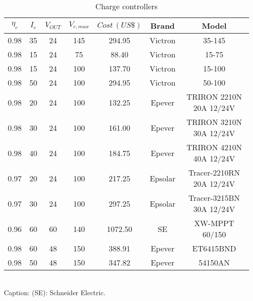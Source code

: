 \documentclass[journal,onecolumn]{IEEEtran}
\begin{document}
\begin{table}[h]
\renewcommand{\arraystretch}{1.3}
\caption{Charge controllers}\label{tab:charg}
\centering
\begin{scriptsize}
\begin{tabular}{c|c|c|c|c|c|c}
\hline
\hline
$\eta_{c}$ & $I_{c}$  & $V_{OUT}$ & $V_{c,max}$ & $Cost \, (US\$)$ & Brand & Model\\
\hline
\hline
0.98 & 35 & 24 & 145 & 294.95 & Victron & 35-145 \\
\hline
0.98 & 15 & 24 & 75 & 88.40 & Victron & 15-75 \\
\hline
0.98 & 15 & 24 & 100 & 137.70 & Victron & 15-100 \\
\hline
0.98 & 50 & 24 & 100 & 294.95 & Victron & 50-100 \\
\hline
0.98 & 20 & 24 & 100 & 132.25 & Epever & TRIRON 2210N 20A 12/24V \\
\hline
0.98 & 30 & 24 & 100 & 161.00 & Epever & TRIRON 3210N 30A 12/24V \\
\hline
0.98 & 40 & 24 & 100 & 184.75 & Epever & TRIRON 4210N 40A 12/24V \\
\hline
0.97 & 20 & 24 & 100 & 217.25 & Epsolar & Tracer-2210RN 20A 12/24V \\
\hline
0.97 & 30 & 24 & 100 & 297.25 & Epsolar & Tracer-3215BN 30A 12/24V \\
\hline
0.96 & 60 & 60 & 140 & 1072.50 & SE & XW-MPPT 60/150 \\
\hline
0.98 & 60 & 48 & 150 & 388.91 & Epever & ET6415BND \\
\hline
0.98 & 50 & 48 & 150 & 347.82 & Epever & 54150AN \\
\hline
\hline
\end{tabular}
\newline
\\Caption: (SE): Schneider Electric.
\end{scriptsize}
\end{table}

\end{document}
